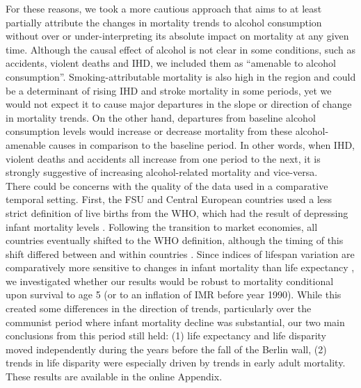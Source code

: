 \documentclass{article}
\begin{document}
\begin{spacing}{1.5}
For these reasons, we took a more cautious approach that aims to at least partially attribute the changes in mortality trends to alcohol consumption without over or under-interpreting its absolute impact on mortality at any given time. Although the causal effect of alcohol is not clear in some conditions, such as accidents, violent deaths and IHD, we included them as ``amenable to alcohol consumption''. Smoking-attributable mortality is also high in the region \citep{ezzati2003estimates} and could be a determinant of rising IHD and stroke mortality in some periods, yet we would not expect it to cause major departures in the slope or direction of change in mortality trends.  On the other hand, departures from baseline alcohol consumption levels would increase or decrease mortality from these alcohol-amenable causes in comparison to the baseline period. In other words, when IHD, violent deaths and accidents all increase from one period to the next, it is strongly suggestive of increasing alcohol-related mortality and vice-versa.\\ 

\textcolor[rgb]{1,0,0}{There could be concerns with the quality of the data used in a comparative temporal setting. First, the FSU and Central European countries used a less strict definition of live births from the WHO, which had the result of depressing infant mortality levels \citep{aleshina2003high,unicef2003social}. Following the transition to market economies, all countries eventually shifted to the WHO definition, although the timing of this shift differed between and within countries \citep{aleshina2003high,unicef2003social}. Since indices of lifespan variation are comparatively more sensitive to changes in infant mortality than life expectancy \citep{vanraalte2013}, we investigated whether our results would be robust to mortality conditional upon survival to age 5 (or to an inflation of IMR before year 1990). While this created some differences in the direction of trends, particularly over the communist period where infant mortality decline was substantial, our two main conclusions from this period still held: (1) life expectancy and life disparity moved independently during the years before the fall of the Berlin wall, (2) trends in life disparity were especially driven by trends in early adult mortality. These results are available in the online Appendix.}\\


\end{spacing}
\end{document}

